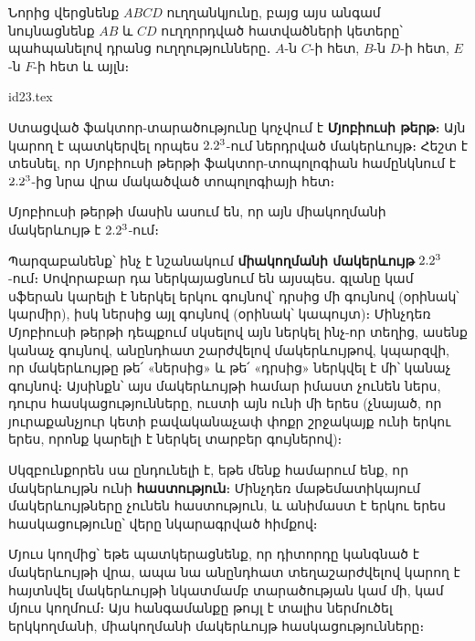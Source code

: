 \documentclass[./main.tex]{subfiles}
\begin{document}
\newpage

\begin{example}\label{ch12ex4}
Նորից վերցնենք $ABCD$ ուղղանկյունը, բայց այս անգամ նույնաց\-նենք $AB$ և $CD$ ուղղորդված հատվածների կետերը՝ պահպանելով դրանց ուղղու\-թյուն\-ները․ $A$-ն $C$-ի հետ, $B$-ն $D$-ի հետ, $E$-ն $F$-ի հետ և այլն։

\smallskip

\begin{center}
{id23.tex}
\end{center}

\par Ստացված ֆակտոր-տարածությունը կոչվում է \textbf{Մյոբիուսի թերթ}։ Այն կարող է պատկերվել որպես $2.2^3$-ում ներդրված մակերևույթ։ Հեշտ է տեսնել, որ Մյոբիուսի թեր\-թի ֆակտոր-տոպոլոգիան համընկնում է $2.2^3$-ից նրա վրա մակածված տոպոլո\-գիա\-յի հետ։

\par Մյոբիուսի թերթի մասին ասում են, որ այն միակողմանի մակերևույթ է $2.2^3$-ում։

\par Պարզաբանենք՝ ինչ է նշանակում \textbf{միակողմանի մակերևույթ} $2.2^3$-ում։ Սովո\-րա\-բար դա ներկայացնում են այսպես․ գլանը կամ սֆերան կարելի է ներկել երկու գույնով՝ դրսից մի գույնով (օրինակ՝ կարմիր), իսկ ներսից այլ գույնով (օրինակ՝ կա\-պույտ)։ Մինչդեռ Մյոբիուսի թերթի դեպքում սկսելով այն ներկել ինչ-որ տեղից, ասենք կանաչ գույնով, անընդհատ շարժվելով մակերևույթով, կպարզվի, որ մակե\-րևույթը թե՛ «ներսից» և թե՛ «դրսից» ներկվել է մի՝ կանաչ գույնով։ Այսինքն՝ այս մա\-կ\-երևույթի համար իմաստ չունեն ներս, դուրս հասկացությունները, ուստի այն ունի մի երես (չնայած, որ յուրաքանչյուր կետի բավականաչափ փոքր շրջակայք ունի երկու երես, որոնք կարելի է ներկել տարբեր գույներով)։

\par Սկզբունքորեն սա ընդունելի է, եթե մենք համարում ենք, որ մակերևույթն ունի \textbf{հաստություն}։ Մինչդեռ մաթեմատիկայում մակերևույթները չունեն հաստություն, և անիմաստ է երկու երես հասկացությունը՝ վերը նկարագրված հիմքով։

\par Մյուս կողմից՝ եթե պատկերացնենք, որ դիտորդը կանգնած է մակերևույթի վրա, ապա նա անընդհատ տեղաշարժվելով կարող է հայտնվել մակերևույթի նկատմամբ տարածության կամ մի, կամ մյուս կողմում։ Այս հանգամանքը թույլ է տա\-լիս ներ\-մու\-ծել երկ\-կողմանի, միակողմանի մակերևույթ հասկացությունները։


\end{example}
\end{document}
